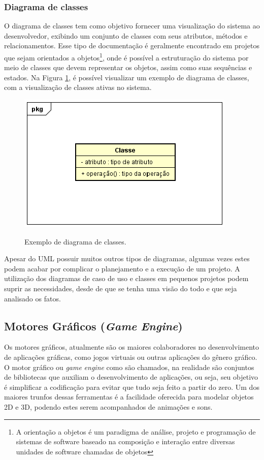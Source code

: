 \documentclass[
	12pt,				%
    oneside,			%
	a4paper,			%
	english,			%
	french,				%
	spanish,			%
	brazil,				%
	]{abntex2}
\begin{document}
		\subsubsection{Diagrama de classes}
			O diagrama de classes tem como objetivo fornecer uma visualização do sistema ao desenvolvedor, exibindo um conjunto de classes com seus atributos, métodos e relacionamentos. Esse tipo de documentação é geralmente encontrado em projetos que sejam orientados a objetos\footnote{A orientação a objetos é um paradigma de análise, projeto e programação de sistemas de software baseado na composição e interação entre diversas unidades de software chamadas de objetos}, onde é possível a estruturação do sistema por meio de classes que devem representar os objetos, assim como suas sequências e estados. Na Figura \ref{fig:02}, é possível visualizar um exemplo de diagrama de classes, com a visualização de classes ativas no sistema.	
			\begin{figure}[H]
				\caption{Exemplo de diagrama de classes.}
				\centering
				\includegraphics[width=0.5\linewidth]{Imagens/02}
				\label{fig:02}
			\end{figure}
		
		Apesar do UML possuir muitos outros tipos de diagramas, algumas vezes estes podem acabar por complicar o planejamento e a execução de um projeto. A utilização dos diagramas de caso de uso e classes em pequenos projetos podem suprir as necessidades, desde de que se tenha uma visão do todo e que seja analisado os fatos.
		
		
	\subsection{Motores Gráficos (\textit{Game} \textit{Engine})}
	
		Os motores gráficos, atualmente são os maiores colaboradores no desenvolvimento de aplicações gráficas, como jogos virtuais ou outras aplicações do gênero gráfico. O motor gráfico ou \textit{game} \textit{engine} como são chamados, na realidade são conjuntos de bibliotecas que auxiliam o desenvolvimento de aplicações, ou seja, seu objetivo é simplificar a codificação para evitar que tudo seja feito a partir do zero. Um dos maiores trunfos dessas ferramentas é a facilidade oferecida para modelar objetos 2D e 3D, podendo estes serem acompanhados de animações e sons.
		
\end{document}

